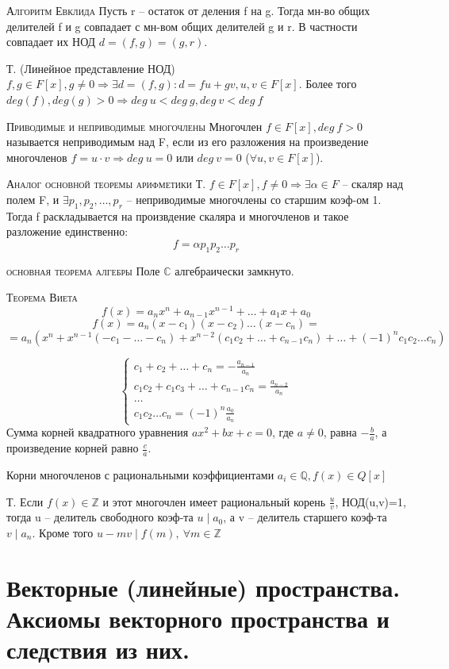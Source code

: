 \documentclass{article}
\begin{document}
\textsc{Алгоритм Евклида}
Пусть r – остаток от деления f на g. Тогда мн-во общих делителей f и g совпадает с мн-вом общих делителей g и r. В частности совпадает их НОД $d=(f,g)=(g,r)$.

Т. (Линейное представление НОД) $f, g\in F[x], g\neq 0\Rightarrow\exists d=(f,g)\colon d=fu+gv, u,v\in F[x]$. Более того $deg(f), deg(g)>0\Rightarrow deg\ u<deg\ g, deg\ v<deg\ f$

\textsc{Приводимые и неприводимые многочлены}
Многочлен $f\in F[x], deg\ f>0$ называется неприводимым над F, если из его разложения на произведение многочленов $f=u\cdot v\Rightarrow deg\ u=0$ или $deg\ v=0$ ($\forall u,v\in F[x]$).

\textsc{Аналог основной теоремы арифметики}
Т. $f\in F[x], f\neq 0\Rightarrow\exists\alpha\in F$ – скаляр над полем F, и $\exists p_1,p_2,\dots,p_r$ – неприводимые многочлены со старшим коэф-ом 1. Тогда f раскладывается на произвдение скаляра и многочленов и такое разложение единственно:
$$f=\alpha p_1p_2\dots p_r$$

\textsc{основная теорема алгебры}
Поле $\mathbb{C}$ алгебраически замкнуто.

\textsc{Теорема Виета}
$$f(x)=a_nx^n+a_{n-1}x^{n-1}+\dots+a_1x+a_0$$
$$f(x)=a_n(x-c_1)(x-c_2)\dots(x-c_n)=$$
$$=a_n(x^n+x^{n-1}(-c_1-\dots-c_n)+x^{n-2}(c_1c_2+\dots+c_{n-1}c_n)+\dots+(-1)^nc_1c_2\dots c_n)$$

\begin{equation*}
    \begin{cases}
        c_1+c_2+\dots+c_n=-\frac{a_{n-1}}{a_n} \\
        c_1c_2+c_1c_3+\dots+c_{n-1}c_n=\frac{a_{n-2}}{a_n} \\
        \dots \\
        c_1c_2\dots c_n=(-1)^n\frac{a_0}{a_n}
    \end{cases}
\end{equation*}
Сумма корней квадратного уравнения $ax^2+bx+c=0$, где $a \neq 0$, равна $-\frac{{b}}{{a}}$, а произведение корней равно $\frac{{c}}{{a}}$.

\textsf{Корни многочленов с рациональными коэффициентами}
$a_i\in \mathbb{Q}, f(x)\in Q[x]$

Т. Если $f(x)\in \mathbb{Z}$ и этот многочлен имеет рациональный корень $\frac{u}{v}$, НОД(u,v)=1, тогда u – делитель
свободного коэф-та $u\mid a_0$, а v – делитель старшего коэф-та $v\mid a_n$. Кроме того $u-mv\mid f(m),\ \forall m\in \mathbb{Z}$

\section{Векторные (линейные) пространства. Аксиомы векторного пространства и следствия из них.}
\end{document}
